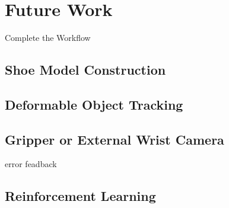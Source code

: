 \chapter{Future Work}

Complete the Workflow

\section{Shoe Model Construction}

\section{Deformable Object Tracking}

\section{Gripper or External Wrist Camera} \label{futurecamera}
error feadback

\section{Reinforcement Learning}